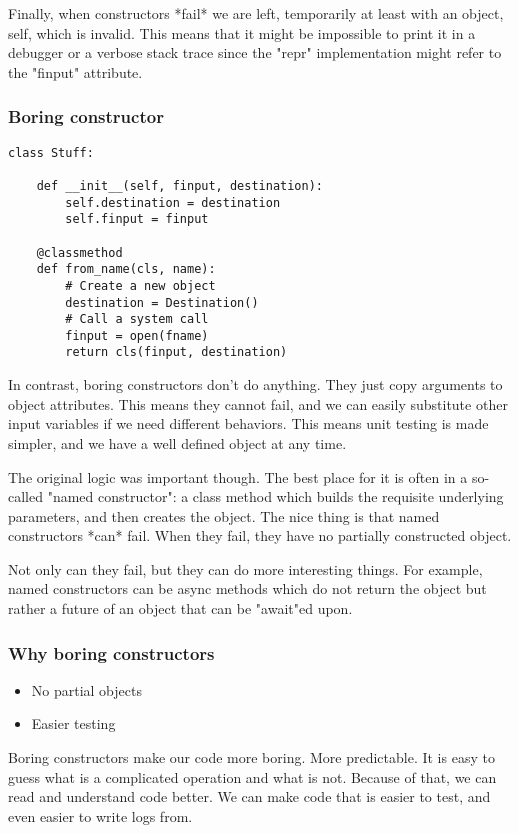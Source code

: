 Finally,
when constructors
*fail*
we are left,
temporarily at least with an object,
self,
which is invalid.
This means that it might be impossible to print it in a debugger
or a verbose stack trace since the "repr" implementation
might refer to the "finput" attribute.


\begin{frame}[fragile]
\frametitle{Boring constructor}

\begin{lstlisting}
class Stuff:

    def __init__(self, finput, destination):
        self.destination = destination
        self.finput = finput

    @classmethod
    def from_name(cls, name):
        # Create a new object
        destination = Destination()
        # Call a system call
        finput = open(fname)
        return cls(finput, destination)
\end{lstlisting}

\end{frame}

In contrast,
boring constructors don't do anything.
They just copy arguments to object attributes.
This means they cannot fail,
and we can easily substitute other input variables if we need
different behaviors.
This means unit testing is made simpler,
and we have a well defined object at any time.

The original logic was important though.
The best place for it is often in a so-called
"named constructor":
a class method which builds the requisite underlying parameters,
and then creates the object.
The nice thing is that named constructors
*can*
fail.
When they fail,
they have no partially constructed object.

Not only can they fail,
but they can do more interesting things.
For example,
named constructors can be async methods
which do not return the object
but rather a future of an object
that can be "await"ed upon.


\begin{frame}[fragile]
\frametitle{Why boring constructors}

\begin{itemize}
\item No partial objects
\item Easier testing
\end{itemize}

\end{frame}

Boring constructors make our code more boring.
More predictable.
It is easy to guess what is a complicated operation
and what is not.
Because of that,
we can read and understand code better.
We can make code that is easier to test,
and even easier to write logs from.

